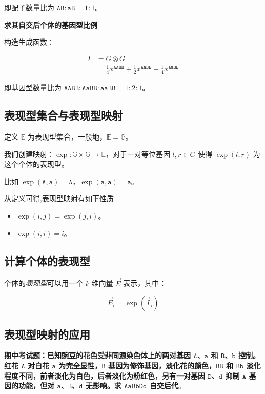 \documentclass[12pt]{article} %
\begin{document}
即配子数量比为 $\texttt{AB} : \texttt{aB}=1:1$。

\textbf{求其自交后个体的基因型比例}

构造生成函数：

$$\begin{aligned}
    I &= G \otimes G \\
        &= \frac{1}{4} x^{\texttt{AABB}} + \frac{1}{2} x^{\texttt{AaBB}} + \frac{1}{4} x^{\texttt{aaBB}}
\end{aligned}$$

即基因型数量比为 $\texttt{AABB} : \texttt{AaBB} : \texttt{aaBB}=1:2:1$。

\subsection{表现型集合与表现型映射}

定义 $\mathbb{E}$ 为表现型集合，一般地，$\mathbb{E}=\mathbb{G}$。

我们创建映射：$\operatorname{exp}:\mathbb{G} \times \mathbb{G} \to \mathbb{E}$，对于一对等位基因 $l,r \in G$ 使得 $\operatorname{exp}(l,r)$ 为这个个体的表现型。


比如 $\operatorname{exp}(\texttt{A},\texttt{a})=\texttt{A}$，$\operatorname{exp}(\texttt{a},\texttt{a})=\texttt{a}$。

从定义可得,表现型映射有如下性质

\begin{itemize}
    \item $\operatorname{exp}(i,j)=\operatorname{exp}(j,i)$。
    \item $\operatorname{exp}(i,i)=i$。
\end{itemize}

\subsection{计算个体的表现型}

个体的\textsl{表现型}可以用一个 $k$ 维向量 $\vec E$ 表示，其中：

$$\vec E_i=\operatorname{exp}(\vec I_i)$$

\subsection{表现型映射的应用}

\textbf{期中考试题：已知豌豆的花色受非同源染色体上的两对基因 $\texttt{A}$、$\texttt{a}$ 和 $\texttt{B}$、$\texttt{b}$ 控制。红花 $\texttt{A}$ 对白花 $\texttt{a}$ 为完全显性，$\texttt{B}$ 基因为修饰基因，淡化花的颜色，$\texttt{BB}$ 和 $\texttt{Bb}$ 淡化程度不同，前者淡化为白色，后者淡化为粉红色，另有一对基因 $\texttt{D}$、$\texttt{d}$ 抑制 $\texttt{A}$ 基因的功能，但对 $\texttt{a}$、$\texttt{B}$、$\texttt{d}$ 无影响。求 $\texttt{AaBbDd}$ 自交后代}。
\end{document}
